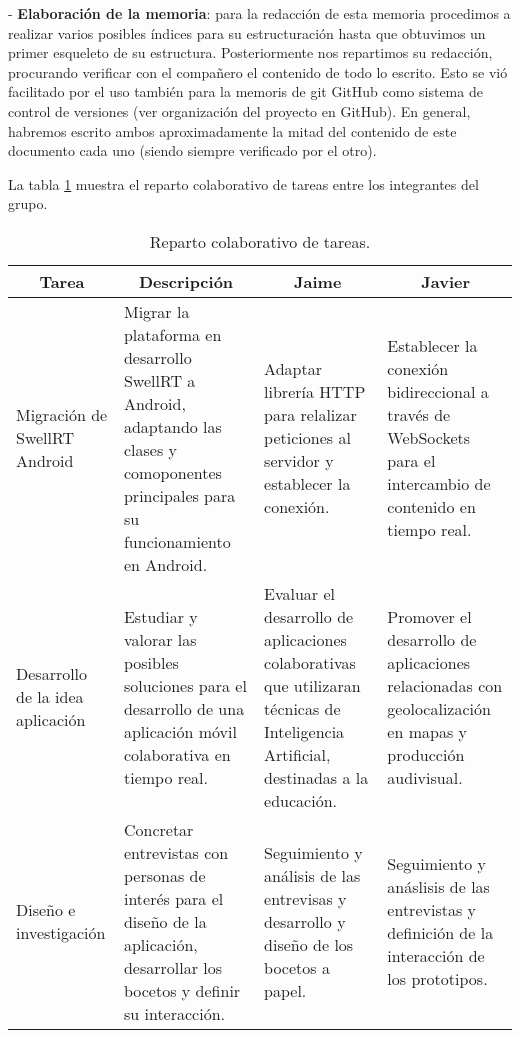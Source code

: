 - \textbf{Elaboración de la memoria}: para la redacción de esta memoria procedimos a realizar varios posibles índices para su estructuración hasta que obtuvimos un primer esqueleto de su estructura. Posteriormente nos repartimos su redacción, procurando verificar con el compañero el contenido de todo lo escrito. Esto se vió facilitado por el uso también para la memoris de git  GitHub como sistema de control de versiones (ver organización del proyecto en GitHub). En general, habremos escrito ambos aproximadamente la mitad del contenido de este documento cada uno (siendo siempre verificado por el otro).

La tabla \ref{fig:tableTasks} muestra el reparto colaborativo de tareas entre los integrantes del grupo.

\begin{table}[!]
\centering
\caption{Reparto colaborativo de tareas.}
\label{fig:tableTasks}
\begin{sideways}
\begin{tabular}{|m{3cm}|m{5.5cm}|m{5cm}|m{5cm}|}
\hline
\multicolumn{1}{|c|}{{\bf Tarea}} & \multicolumn{1}{c|}{{\bf Descripción}}                                                                                                   & \multicolumn{1}{c|}{{\bf Jaime}}                                                                                                   & \multicolumn{1}{c|}{{\bf Javier}}                                                                            \\ \hline
Migración de SwellRT Android      & Migrar la plataforma en desarrollo SwellRT a Android, adaptando las clases y comoponentes principales para su funcionamiento en Android. & Adaptar librería HTTP para relalizar peticiones al servidor y establecer la conexión.                                              & Establecer la conexión bidireccional a través de WebSockets para el intercambio de contenido en tiempo real. \\ \hline
Desarrollo de la idea aplicación  & Estudiar y valorar las posibles soluciones para el desarrollo de una aplicación móvil colaborativa en tiempo real.                       & Evaluar el desarrollo de aplicaciones colaborativas que utilizaran técnicas de Inteligencia Artificial, destinadas a la educación. & Promover el desarrollo de aplicaciones relacionadas con geolocalización en mapas y producción audivisual.    \\ \hline
Diseño e investigación            & Concretar entrevistas con personas de interés para el diseño de la aplicación, desarrollar los bocetos y definir su interacción.         & Seguimiento y análisis de las entrevisas y desarrollo y diseño de los bocetos a papel.                                             & Seguimiento y anáslisis de las entrevistas y definición de la interacción de los prototipos.                 \\ \hline

\end{tabular}
\end{sideways}
\end{table}
